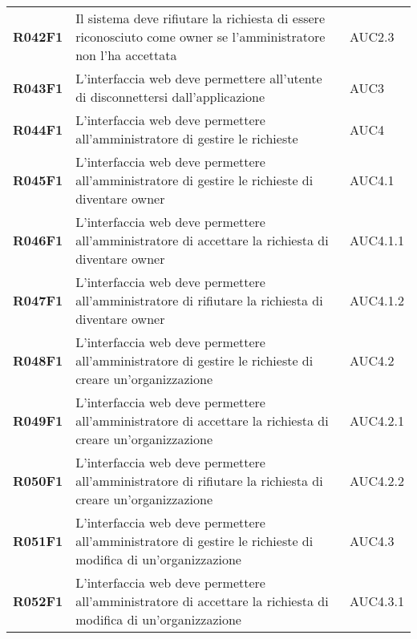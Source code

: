 \documentclass[../analisi-dei-requisiti]{subfiles}
\begin{document}
\begin{longtable}[H]{>{\centering\bfseries}m{3cm} >{\centering}m{10cm} >{\centering\arraybackslash}m{3cm}}
  R042F1                  & Il sistema deve rifiutare la richiesta di essere riconosciuto come owner se l'amministratore non l'ha accettata                                & AUC2.3                        \\
  R043F1                  & L'interfaccia web deve permettere all'utente di disconnettersi dall'applicazione                                                               & AUC3                          \\
  R044F1                  & L'interfaccia web deve permettere all'amministratore di gestire le richieste                                                                   & AUC4                          \\
  R045F1                  & L'interfaccia web deve permettere all'amministratore di gestire le richieste di diventare owner                                                & AUC4.1                        \\
  R046F1                  & L'interfaccia web deve permettere all'amministratore di accettare la richiesta di diventare owner                                              & AUC4.1.1                      \\
  R047F1                  & L'interfaccia web deve permettere all'amministratore di rifiutare la richiesta di diventare owner                                              & AUC4.1.2                      \\
  R048F1                  & L'interfaccia web deve permettere all'amministratore di gestire le richieste di creare un'organizzazione                                       & AUC4.2                        \\
  R049F1                  & L'interfaccia web deve permettere all'amministratore di accettare la richiesta di creare un'organizzazione                                     & AUC4.2.1                      \\
  R050F1                  & L'interfaccia web deve permettere all'amministratore di rifiutare la richiesta di creare un'organizzazione                                     & AUC4.2.2                      \\
  R051F1                  & L'interfaccia web deve permettere all'amministratore di gestire le richieste di modifica di un'organizzazione                                  & AUC4.3                        \\
  R052F1                  & L'interfaccia web deve permettere all'amministratore di accettare la richiesta di modifica di un'organizzazione                                & AUC4.3.1                      \\

\end{longtable}
\end{document}
